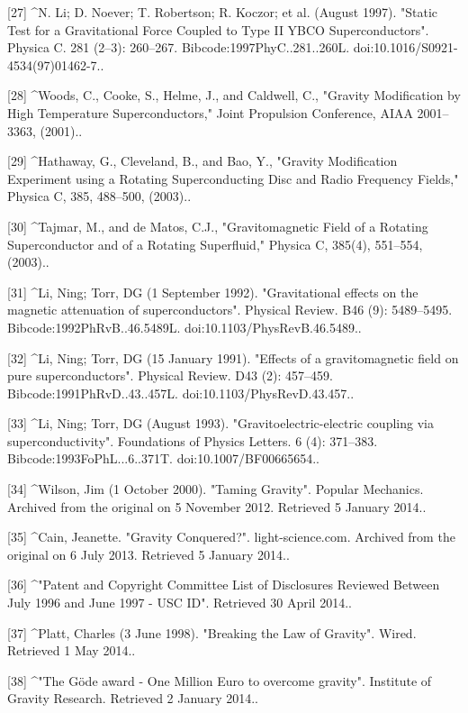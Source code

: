 [27]
^N. Li; D. Noever; T. Robertson; R. Koczor; et al. (August 1997). "Static Test for a Gravitational Force Coupled to Type II YBCO Superconductors". Physica C. 281 (2–3): 260–267. Bibcode:1997PhyC..281..260L. doi:10.1016/S0921-4534(97)01462-7..

[28]
^Woods, C., Cooke, S., Helme, J., and Caldwell, C., "Gravity Modification by High Temperature Superconductors," Joint Propulsion Conference, AIAA 2001–3363, (2001)..

[29]
^Hathaway, G., Cleveland, B., and Bao, Y., "Gravity Modification Experiment using a Rotating Superconducting Disc and Radio Frequency Fields," Physica C, 385, 488–500, (2003)..

[30]
^Tajmar, M., and de Matos, C.J., "Gravitomagnetic Field of a Rotating Superconductor and of a Rotating Superfluid," Physica C, 385(4), 551–554, (2003)..

[31]
^Li, Ning; Torr, DG (1 September 1992). "Gravitational effects on the magnetic attenuation of superconductors". Physical Review. B46 (9): 5489–5495. Bibcode:1992PhRvB..46.5489L. doi:10.1103/PhysRevB.46.5489..

[32]
^Li, Ning; Torr, DG (15 January 1991). "Effects of a gravitomagnetic field on pure superconductors". Physical Review. D43 (2): 457–459. Bibcode:1991PhRvD..43..457L. doi:10.1103/PhysRevD.43.457..

[33]
^Li, Ning; Torr, DG (August 1993). "Gravitoelectric-electric coupling via superconductivity". Foundations of Physics Letters. 6 (4): 371–383. Bibcode:1993FoPhL...6..371T. doi:10.1007/BF00665654..

[34]
^Wilson, Jim (1 October 2000). "Taming Gravity". Popular Mechanics. Archived from the original on 5 November 2012. Retrieved 5 January 2014..

[35]
^Cain, Jeanette. "Gravity Conquered?". light-science.com. Archived from the original on 6 July 2013. Retrieved 5 January 2014..

[36]
^"Patent and Copyright Committee List of Disclosures Reviewed Between July 1996 and June 1997 - USC ID". Retrieved 30 April 2014..

[37]
^Platt, Charles (3 June 1998). "Breaking the Law of Gravity". Wired. Retrieved 1 May 2014..

[38]
^"The Göde award - One Million Euro to overcome gravity". Institute of Gravity Research. Retrieved 2 January 2014..